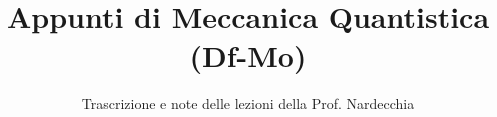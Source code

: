 \documentclass[a4paper,12pt]{article}
\title{Appunti di Meccanica Quantistica (Df-Mo)}
\author{Trascrizione e note delle lezioni della Prof. Nardecchia}
\date{}
\begin{document}
\maketitle
\projectintro
\tableofcontents
\newpage

\end{document}

